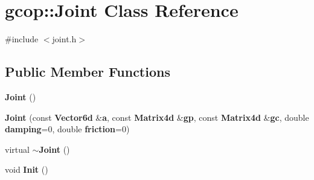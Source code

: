\section{gcop\-:\-:\-Joint \-Class \-Reference}
\label{classgcop_1_1Joint}


{\ttfamily \#include $<$joint.\-h$>$}

\subsection*{\-Public \-Member \-Functions}
\begin{DoxyCompactItemize}
\item 
{\bf \-Joint} ()
\item 
{\bf \-Joint} (const {\bf \-Vector6d} \&{\bf a}, const {\bf \-Matrix4d} \&{\bf gp}, const {\bf \-Matrix4d} \&{\bf gc}, double {\bf damping}=0, double {\bf friction}=0)
\item 
virtual {\bf $\sim$\-Joint} ()
\item 
void {\bf \-Init} ()
\end{DoxyCompactItemize}
